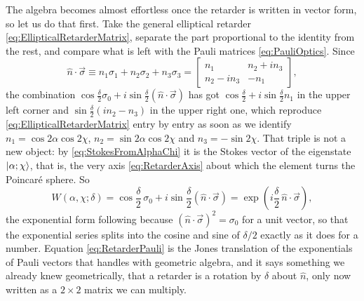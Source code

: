             The algebra becomes almost effortless once the retarder is written in vector form, so let us do that first. Take the general elliptical retarder \ref{eq:EllipticalRetarderMatrix}, separate the part proportional to the identity from the rest, and compare what is left with the Pauli matrices \ref{eq:PauliOptics}. Since
            \begin{equation*}
                \hat{n}\cdot\vec{\sigma} \equiv n_1\sigma_1+n_2\sigma_2+n_3\sigma_3 = \begin{bmatrix} n_1 & n_2+in_3 \\ n_2-in_3 & -n_1 \end{bmatrix},
            \end{equation*}
            the combination $\cos\frac{\delta}{2}\sigma_0+i\sin\frac{\delta}{2}\left(\hat{n}\cdot\vec{\sigma}\right)$ has got $\cos\frac\delta2+i\sin\frac\delta2 n_1$ in the upper left corner and $\sin\frac{\delta}{2}\left(in_2-n_3\right)$ in the upper right one, which reproduce \ref{eq:EllipticalRetarderMatrix} entry by entry as soon as we identify $n_1=\cos2\alpha\cos2\chi$, $n_2=\sin2\alpha\cos2\chi$ and $n_3=-\sin2\chi$. That triple is not a new object: by \ref{eq:StokesFromAlphaChi} it is the Stokes vector of the eigenstate $\ket{\alpha;\chi}$, that is, the very axis \ref{eq:RetarderAxis} about which the element turns the Poincaré sphere. So
            \begin{equation}\label{eq:RetarderPauli}
                \boxed{\;W(\alpha,\chi;\delta) = \cos\frac{\delta}{2}\,\sigma_0 + i\sin\frac{\delta}{2}\left(\hat{n}\cdot\vec{\sigma}\right) = \exp\left(i\frac{\delta}{2}\,\hat{n}\cdot\vec{\sigma}\right),\;}
            \end{equation}
            the exponential form following because $\left(\hat{n}\cdot\vec{\sigma}\right)^2=\sigma_0$ for a unit vector, so that the exponential series splits into the cosine and sine of $\delta/2$ exactly as it does for a number. Equation \ref{eq:RetarderPauli} is the Jones translation of the exponentials of Pauli vectors that \citep{pabon2023tunable} handles with geometric algebra, and it says something we already knew geometrically, that a retarder is a rotation by $\delta$ about $\hat n$, only now written as a $2\times2$ matrix we can multiply.

